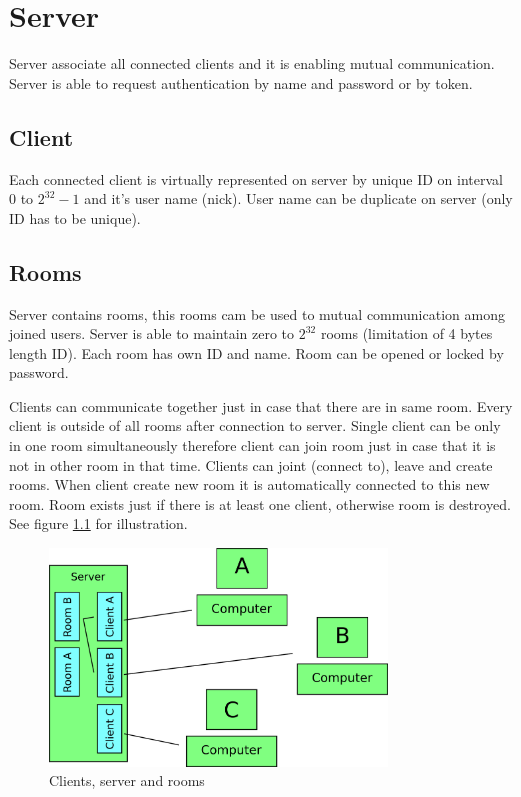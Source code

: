 \chapter{Server}
\label{server}

Server associate all connected clients and it is enabling mutual communication. Server is able to request authentication by name and password or by token.

\section{Client}

Each connected client is virtually represented on server by unique ID on interval $0$ to $2^{32} - 1$ and it's user name (nick). User name can be duplicate on server (only ID has to be unique).

\section{Rooms}

Server contains rooms, this rooms cam be used to mutual communication among joined users. Server is able to maintain zero to $2^{32}$ rooms (limitation of 4 bytes length ID). Each room has own ID and name. Room can be opened or locked by password.

Clients can communicate together just in case that there are in same room. Every client is outside of all rooms after connection to server. Single client can be only in one room simultaneously therefore client can join room just in case that it is not in other room in that time. Clients can joint (connect to), leave and create rooms. When client create new room it is automatically connected to this new room. Room exists just if there is at least one client, otherwise room is destroyed. See figure \ref{server.pictures.server_client_rooms} for illustration.

\begin{figure}[h]
  \centering
  \includegraphics[width=0.80\textwidth]{diagrams/server_client_rooms.png}
  \caption{Clients, server and rooms}
  \label{server.pictures.server_client_rooms}
\end{figure}

